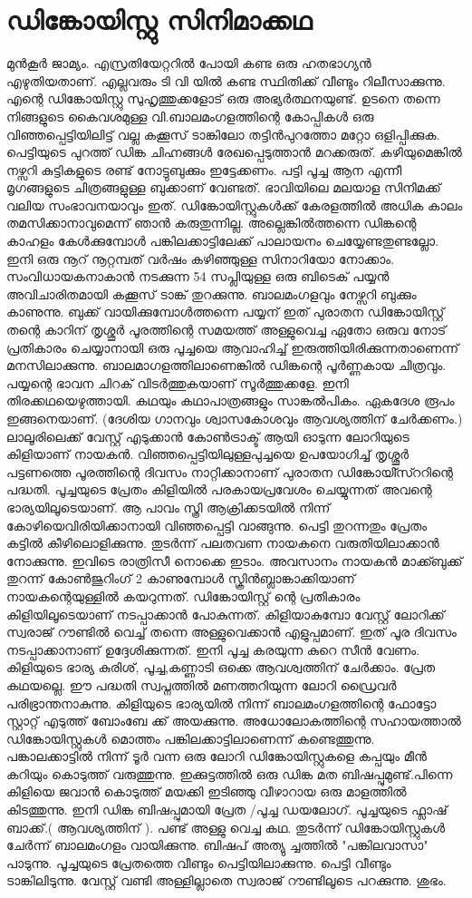 \documentclass[10pt,a4paper]{report}
\begin{document}
 \section{ഡിങ്കോയിസ്റ്റു സിനിമാക്കഥ  }
 മുൻകൂർ ജാമ്യം. എസ്രതിയേറ്ററിൽ പോയി കണ്ട ഒരു ഹതഭാഗ്യൻ എഴുതിയതാണ്. എല്ലവരും ടി വി യിൽ കണ്ട സ്ഥിതിക്ക് വീണ്ടും റിലീസാക്കുന്നു. എന്റെ ഡിങ്കോയിസ്റ്റു സുഹൃത്തുക്കളോട് ഒരു അഭ്യർത്ഥനയുണ്ട്. ഉടനെ തന്നെ നിങ്ങളുടെ കൈവശമുള്ള വി.ബാലമംഗളത്തിന്റെ കോപ്പികൾ ഒരു വിഞ്ഞപ്പെട്ടിയിലിട്ട് വല്ല കക്കൂസ് ടാങ്കിലോ തട്ടിൻപുറത്തോ മറ്റോ ഒളിപ്പിക്കുക. പെട്ടിയുടെ പുറത്ത് ഡിങ്ക ചിഹ്നങ്ങൾ രേഖപ്പെടുത്താൻ മറക്കരുത്. കഴിയുമെങ്കിൽ നഴ്സറി കുട്ടികളുടെ രണ്ട് നോട്ടുബുക്കും ഇട്ടേക്കണം. പട്ടി പൂച്ച ആന എന്നീ മൃഗങ്ങളുടെ ചിത്രങ്ങളുള്ള ബുക്കാണ് വേണ്ടത്. ഭാവിയിലെ മലയാള സിനിമക്ക് വലിയ സംഭാവനയാവും ഇത്. ഡിങ്കോയിസ്റ്റുകൾക്ക് കേരളത്തിൽ അധിക കാലം തമസിക്കാനാവുമെന്ന് ഞാൻ കരുതുന്നില്ല. അല്ലെങ്കിൽത്തന്നെ ഡിങ്കന്റെ കാഹളം കേൾക്കുമ്പോൾ പങ്കിലക്കാട്ടിലേക്ക് പാലായനം ചെയ്യേണ്ടതുണ്ടല്ലോ. ഇനി ഒരു നൂറ് നൂറ്റമ്പത് വർഷം കഴിഞ്ഞുള്ള സിനാറിയോ നോക്കാം. സംവിധായകനാകാൻ നടക്കുന്ന 54 സപ്ലിയുള്ള ഒരു ബിടെക് പയ്യൻ അവിചാരിതമായി കക്കൂസ് ടാങ്ക് തുറക്കുന്നു. ബാലമംഗളവും നേഴ്സറി ബുക്കും കാണുന്നു. ബുക്ക് വായിക്കുമ്പോൾത്തന്നെ പയ്യന് ഇത് പുരാതന ഡിങ്കോയിസ്റ്റ് തന്റെ കാറിന് തൃശ്ശൂർ പൂരത്തിന്റെ സമയത്ത് അള്ളുവെച്ച ഏതോ ഒരുവ നോട് പ്രതികാരം ചെയ്യാനായി ഒരു പൂച്ചയെ ആവാഹിച്ച് ഇരുത്തിയിരിക്കുന്നതാണെന്ന് മനസിലാക്കുന്നു. ബാലമാഗളത്തിലാണെങ്കിൽ ഡിങ്കന്റെ പൂർണ്ണകായ ചിത്രവും. പയ്യന്റെ ഭാവന ചിറക് വിടർത്തുകയാണ് സൂർത്തുക്കളേ. ഇനി തിരക്കഥയെഴുത്തായി. കഥയും കഥാപാത്രങ്ങളും സാങ്കൽപികം. ഏകദേശ രൂപം ഇങ്ങനെയാണ്. (ദേശിയ ഗാനവും ശ്വാസകോശവും ആവശ്യത്തിന് ചേർക്കണം.) ലാലൂരിലെക്ക് വേസ്റ്റ് എടുക്കാൻ കോൺട്രാക്ട് ആയി ഓടുന്ന ലോറിയുടെ കിളിയാണ് നായകൻ. വിഞ്ഞപ്പെട്ടിയിലുള്ളപുച്ചയെ ഉപയോഗിച്ച് തൃശ്ശൂർ പട്ടണത്തെ പൂരത്തിന്റെ ദിവസം നാറ്റിക്കാനാണ് പുരാതന ഡിങ്കോയി്സ്ററിന്റെ പദ്ധതി. പൂച്ചയുടെ പ്രേതം കിളിയിൽ പരകായപ്രവേശം ചെയ്യുന്നത് അവന്റെ ഭാര്യയിലൂടെയാണ്. ആ പാവം സ്ത്രി ആക്രിക്കടയിൽ നിന്ന് കോഴിയെവിരിയിക്കാനായി വിഞ്ഞപ്പെട്ടി വാങ്ങുന്നു. പെട്ടി തുറന്നതും പ്രേതം കട്ടിൽ കീഴിലൊളിക്കുന്നു. തുടർന്ന് പലതവണ നായകനെ വരുതിയിലാക്കാൻ നോക്കുന്നു. ഇവിടെ രാത്രിസീ നൊക്കെ ഇടാം. അവസാനം നായകൻ മാക്ക്ബുക്ക് തുറന്ന് കോൺജുറിംഗ് 2 കാണുമ്പോൾ സ്ക്രിൻബ്ലാങ്കാക്കിയാണ് നായകന്റെയുള്ളിൽ കയറുന്നത്. ഡിങ്കോയിസ്റ്റ് ന്റെ പ്രതികാരം കിളിയിലൂടെയാണ് നടപ്പാക്കാൻ പോകുന്നത്. കിളിയാകുമ്പോ വേസ്റ്റ് ലോറിക്ക് സ്വരാജ് റൗണ്ടിൽ വെച്ച് തന്നെ അള്ളുവെക്കാൻ എളുപ്പമാണ്. ഇത് പൂര ദിവസം നടപ്പാക്കാനാണ് ഉദ്ദേശിക്കുന്നത്. ഇനി പൂച്ച കരയുന്ന കുറെ സീൻ വേണം. കിളിയുടെ ഭാര്യ കുരിശ്, പൂച്ച,കണ്ണാടി ഒക്കെ ആവശ്വത്തിന് ചേർക്കാം. പ്രേത കഥയല്ലെ. ഈ പദ്ധതി സ്വപ്നത്തിൽ മണത്തറിയുന്ന ലോറി ഡ്രൈവർ പരിഭ്രാന്തനാകുന്നു. കിളിയുടെ ഭാര്യയിൽ നിന്ന് ബാലമംഗളത്തിന്റെ ഫോട്ടോ സ്റ്റാറ്റ് എടുത്ത് ബോംബേ ക്ക് അയക്കുന്നു. അധോലോകത്തിന്റെ സഹായത്താൽ ഡിങ്കോയിസ്റ്റുകൾ മൊത്തം പങ്കിലക്കാട്ടിലാണെന്ന് കണ്ടെത്തുന്നു. പങ്കാലക്കാട്ടിൽ നിന്ന് ടൂർ വന്ന ഒരു ലോറി ഡിങ്കോയിസ്റ്റുകളെ കപ്പയും മീൻ കറിയും കൊടുത്ത് വരുത്തുന്നു. ഇക്കുട്ടത്തിൽ ഒരു ഡിങ്ക മത ബിഷപ്പുമുണ്ട്.പിന്നെ കിളിയെ ജവാൻ കൊടുത്ത് മയക്കി ഇടിഞ്ഞു വീഴാറായ ഒരു മാളത്തിൽ കിടത്തുന്നു. ഇനി ഡിങ്ക ബിഷപ്പുമായി പ്രേത /പൂച്ച ഡയലോഗ്. പൂച്ചയുടെ ഫ്ലാഷ് ബാക്ക്.( ആവശ്യത്തിന് ). പണ്ട് അള്ളു വെച്ച കഥ. തുടർന്ന് ഡിങ്കോയിസ്റ്റുകൾ ചേർന്ന് ബാലമംഗളം വായിക്കുന്നു. ബിഷപ് അത്യു ച്ചത്തിൽ "പങ്കിലവാസാ" പാടുന്നു. പൂച്ചയുടെ പ്രേതത്തെ വീണ്ടും പെട്ടിയിലാക്കുന്നു. പെട്ടി വീണ്ടും ടാങ്കിലിടുന്നു. വേസ്റ്റ് വണ്ടി അള്ളില്ലാതെ സ്വരാജ് റൗണ്ടിലൂടെ പറക്കുന്നു. ശുഭം.
\end{document}
